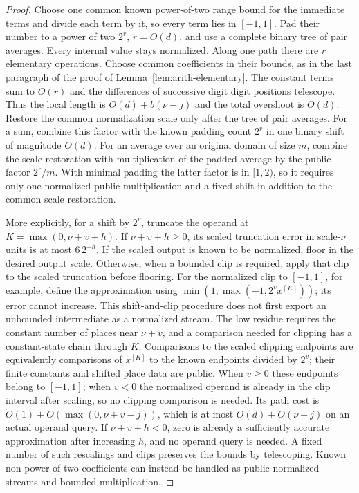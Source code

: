 \begin{proof}
Choose one common known power-of-two range bound for the immediate
terms and divide each term by it, so every term lies in $[-1,1]$.
Pad their number to a power of two $2^r$, $r=O(d)$, and use a complete
binary tree of pair averages.  Every internal value stays normalized.
Along one path there are $r$ elementary operations.  Choose common
coefficients in their bounds, as in the last paragraph of the
proof of Lemma~\ref{lem:arith-elementary}.  The constant terms
sum to $O(r)$ and the differences of successive digit digit positions
telescope.  Thus the local length is $O(d)+b(\nu-j)$ and the
total overshoot is $O(d)$.  Restore the common normalization scale
only after the tree of pair averages.  For a sum, combine this factor
with the known padding count $2^r$ in one binary shift of magnitude
$O(d)$.  For an average over an original domain of size $m$, combine
the scale restoration with multiplication of the padded average by
the public factor $2^r/m$.  With minimal padding the latter factor
is in $[1,2)$, so it requires only one normalized public multiplication
and a fixed shift in addition to the common scale restoration.

More explicitly, for a shift by $2^v$, truncate the operand at
$K=\max(0,\nu+v+h)$.  If $\nu+v+h\geq0$, its scaled truncation
error in scale-$\nu$ units is at most $6\,2^{-h}$.  If the scaled
output is known to be normalized, floor in the desired output
scale.  Otherwise, when a bounded clip is required, apply that
clip to the scaled truncation before flooring.  For the
normalized clip to $[-1,1]$, for example, define the approximation
using $\min(1,\max(-1,2^v x^{[K]}))$; its error cannot increase.
This shift-and-clip procedure does not first export an unbounded
intermediate as a normalized stream.
The low residue requires the constant number of places near
$\nu+v$, and a comparison needed for clipping has a constant-state
chain through $K$.  Comparisons to the scaled clipping endpoints
are equivalently comparisons of $x^{[K]}$ to the known endpoints
divided by $2^v$; their finite constants and shifted place data
are public.  When $v\geq0$ these endpoints belong to $[-1,1]$;
when $v<0$ the normalized operand is already in the clip interval
after scaling, so no clipping comparison is needed.  Its path cost is
$O(1)+O(\max(0,\nu+v-j))$, which is at most
$O(d)+O(\nu-j)$ on an actual operand query.  If $\nu+v+h<0$, zero
is already a sufficiently accurate approximation after increasing
$h$, and no operand query is needed.  A fixed number of such
rescalings and clips preserves the bounds by telescoping.
Known non-power-of-two coefficients can instead be handled as
public normalized streams and bounded multiplication.
\end{proof}

